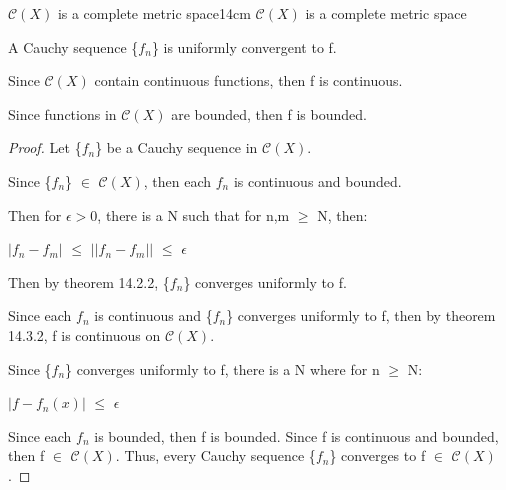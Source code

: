     \vspace{0.5cm}



    \begin{wtheorem}{$\mathscr{C}(X)$ is a complete metric space}{14cm}
        $\mathscr{C}(X)$ is a complete metric space        
    \end{wtheorem}

    \begin{intuition}
        A Cauchy sequence \{$f_n$\} is uniformly convergent to f.

        Since $\mathscr{C}(X)$ contain continuous functions, then f is continuous.
        
        Since functions in $\mathscr{C}(X)$ are bounded, then f is bounded.
    \end{intuition}

    \vspace{0.1cm}

    \begin{proof}
        Let \{$f_n$\} be a Cauchy sequence in $\mathscr{C}(X)$.

        Since \{$f_n$\} $\in$ $\mathscr{C}(X)$, then each
        $f_n$ is continuous and bounded.

        Then for $\epsilon > 0$, there is a N such that for n,m $\geq$ N, then:

        \hspace{0.5cm}
        $|f_n - f_m|$
        $\leq$ $||f_n - f_m||$
        $\leq$ $\epsilon$

        Then by {\color{red} theorem 14.2.2}, \{$f_n$\} converges uniformly to f.

        Since each $f_n$ is continuous and \{$f_n$\} converges uniformly to f,
        then by {\color{red} theorem 14.3.2}, f is continuous on $\mathscr{C}(X)$.

        Since \{$f_n$\} converges uniformly to f, there is a N where for n $\geq$ N: 

        \hspace{0.5cm}
        $|f - f_n(x)|$ $\leq$ $\epsilon$
        
        Since each $f_n$ is bounded, then f is bounded.
        Since f is continuous and bounded, then f $\in$ $\mathscr{C}(X)$.
        Thus, every Cauchy sequence \{$f_n$\} converges to f $\in$ $\mathscr{C}(X)$.
    \end{proof}

    \newpage





